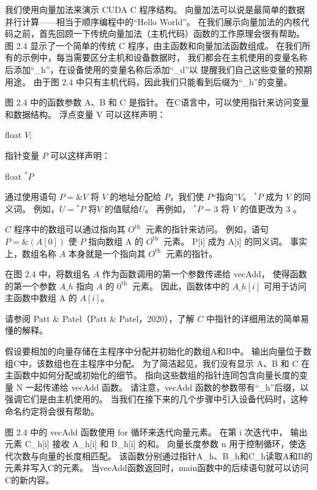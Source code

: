 我们使用向量加法来演示 CUDA C 程序结构。 向量加法可以说是最简单的数据并行计算——相当于顺序编程中的“Hello World”。 
在我们展示向量加法的内核代码之前，首先回顾一下传统向量加法（主机代码）函数的工作原理会很有帮助。 
图 2.4 显示了一个简单的传统 C 程序，由主函数和向量加法函数组成。 在我们所有的示例中，每当需要区分主机和设备数据时，
我们都会在主机使用的变量名称后添加“\_h”，在设备使用的变量名称后添加“\_d”以 提醒我们自己这些变量的预期用途。 
由于图 2.4 中只有主机代码，因此我们只能看到后缀为“\_h”的变量。

\begin{remark}[C语言中的指针]
	图 2.4 中的函数参数 A、B 和 C 是指针。 在C语言中，可以使用指针来访问变量和数据结构。 浮点变量 V 可以这样声明：
	
float $V$;

指针变量 $P$ 可以这样声明：

float ${ }^{*} P$

通过使用语句 $P=\& V$ 将 $V$ 的地址分配给 $P$，我们使 $P$“指向”$V$。 ${ }^{*} P$ 成为 $V$ 的同义词。 
例如，$U={ }^{*} P$ 将$V$ 的值赋给$U$。 再例如， ${ }^{*} P=3$ 将 $V$ 的值更改为 3 。

$C$ 程序中的数组可以通过指向其 $O^{\text {th }}$ 元素的指针来访问。 
例如，语句 $P=\&(A[0])$ 使 $P$ 指向数组 A 的 $O^{\text {th }}$ 元素。 
P[i] 成为 A[i] 的同义词。 事实上，数组名称 $A$ 本身就是一个指向其 $O^{\text {th }}$ 元素的指针。

在图 2.4 中，将数组名 $A$ 作为函数调用的第一个参数传递给 vecAdd，
使得函数的第一个参数 $A \_h$ 指向 $A$ 的 $0^{\text {th }}$ 元素。 
因此，函数体中的 $A \_h[i]$ 可用于访问主函数中数组 $\mathrm{A}$ 的 $A[i]$。

请参阅 Patt \& Patel（Patt \& Patel，2020），了解 $C$ 中指针的详细用法的简单易懂的解释。
\end{remark}

假设要相加的向量存储在主程序中分配并初始化的数组A和B中。 输出向量位于数组C中，该数组也在主程序中分配。 
为了简洁起见，我们没有显示 A、B 和 C 在主函数中如何分配或初始化的细节。 
指向这些数组的指针连同包含向量长度的变量 N 一起传递给 vecAdd 函数。 
请注意，vecAdd 函数的参数带有“\_h”后缀，以强调它们是由主机使用的。 
当我们在接下来的几个步骤中引入设备代码时，这种命名约定将会很有帮助。

图 2.4 中的 vecAdd 函数使用 for 循环来迭代向量元素。 在第 i 次迭代中，
输出元素 C\_h[i] 接收 A\_h[i] 和 B\_h[i] 的和。 向量长度参数 n 用于控制循环，使迭代次数与向量的长度相匹配。 
该函数分别通过指针A\_h、B\_h和C\_h读取A和B的元素并写入C的元素。 
当vecAdd函数返回时，main函数中的后续语句就可以访问C的新内容。

